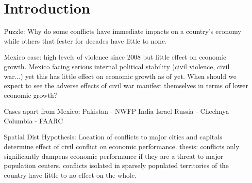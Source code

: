 \section{Introduction}
\label{intro}

Puzzle: Why do some conflicts have immediate impacts on a country's economy while others that fester for decades have little to none. 

	Mexico case: high levels of violence since 2008 but little effect on economic growth. Mexico facing serious internal political stability (civil violence, civil war...) yet this has little effect on economic growth as of yet. When should we expect to see the adverse effects of civil war manifest themselves in terms of lower economic growth?

	Cases apart from Mexico:
		Pakistan - NWFP
		India
		Israel
		Russia - Chechnya
		Columbia - FAARC

Spatial Dist Hypothesis: Location of conflicts to major cities and capitals determine effect of civil conflict on economic performance. thesis: conflicts only significantly dampens economic performance if they are a threat to major population centers. conflicts isolated in sparsely populated territories of the country have little to no effect on the whole. 
